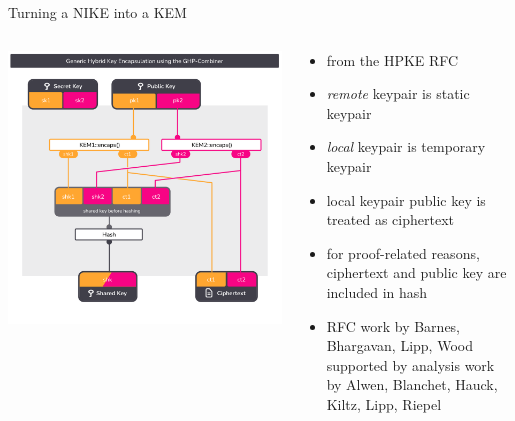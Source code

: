 \begin{frame}{Turning a NIKE into a KEM}
  \begin{columns}[c]
    \begin{column}{.55\linewidth}
    \includegraphics[width=\linewidth,page=2,clip=true,trim={29 43  29 58}]{graphics/rosenpass-encapsulation-combiner.pdf}
    \end{column}%
    \begin{column}{.45\linewidth}
      \small
      \begin{itemize}
        \item from the HPKE RFC~\citeHpke
        \item \emph{remote} keypair is static keypair
        \item \emph{local} keypair is temporary keypair
        \item local keypair public key is treated as ciphertext
        \item for proof-related reasons, ciphertext and public key
          are included in hash
        \item RFC work by Barnes, Bhargavan, Lipp, Wood supported by
          analysis work by Alwen, Blanchet, Hauck, Kiltz, Lipp, Riepel~\citeHpke
      \end{itemize}
    \end{column}
  \end{columns}
\end{frame}

